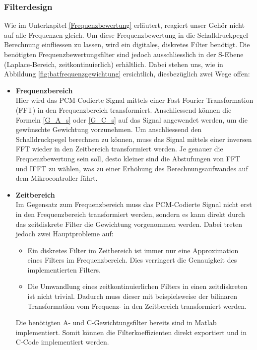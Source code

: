 \documentclass[12pt]{article}
\begin{document}
	\subsubsection*{Filterdesign}
	Wie im Unterkapitel \ref{Frequenzbewertung} erläutert, reagiert unser Gehör nicht auf alle Frequenzen gleich. Um diese Frequenzbewertung in die Schalldruckpegel-Berechnung einfliessen zu lassen, wird ein digitales, diskretes Filter benötigt. Die benötigten Frequenzbewertungsfilter sind jedoch ausschliesslich in der S-Ebene (Laplace-Bereich, zeitkontinuierlich) erhältlich. Dabei stehen uns, wie in Abbildung \ref{fig:batfrequenzgewichtung} ersichtlich, diesbezüglich zwei Wege offen:
	\begin{itemize}
		\item \textbf{Frequenzbereich} \\
		Hier wird das PCM-Codierte Signal mittels einer Fast Fourier Transformation (FFT) in den Frequenzbereich transformiert. Anschliessend können die Formeln \ref{G_A_s} oder \ref{G_C_s} auf das Signal angewendet werden, um die gewünschte Gewichtung vorzunehmen. Um anschliessend den Schalldruckpegel berechnen zu können, muss das Signal mittels einer inversen FFT wieder in den Zeitbereich transformiert werden. Je genauer die Frequenzbewertung sein soll, desto kleiner sind die Abstufungen von FFT und IFFT zu wählen, was zu einer Erhöhung des Berechnungsaufwandes auf dem Mikrocontroller führt.
		\item \textbf{Zeitbereich} \\
		Im Gegensatz zum Frequenzbereich muss das PCM-Codierte Signal nicht erst in den Frequenzbereich transformiert werden, sondern es kann direkt durch das zeitdiskrete Filter die Gewichtung vorgenommen werden. Dabei treten jedoch zwei Hauptprobleme auf: 
		\begin{itemize}
			\item Ein diskretes Filter im Zeitbereich ist immer nur eine Approximation eines Filters im Frequenzbereich. Dies verringert die Genauigkeit des implementierten Filters. 
			\item Die Umwandlung eines zeitkontinuierlichen Filters in einen zeitdiskreten ist nicht trivial. Dadurch muss dieser mit beispielsweise der bilinaren Transformation \cite{oppenheim_alan_v_zeitdiskrete_1989} vom Frequenz- in den Zeitbereich transformiert werden. 
		\end{itemize} Die benötigten A- und C-Gewichtungsfilter bereits sind in Matlab implementiert. Somit können die Filterkoeffizienten direkt exportiert und in C-Code implementiert werden.
	\end{itemize}
\end{document}
